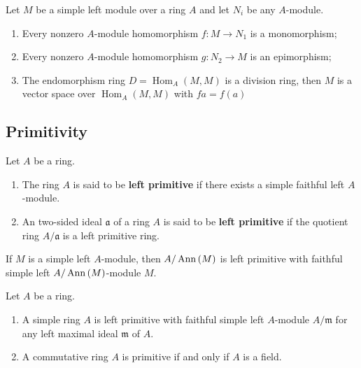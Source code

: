 \begin{lemma}[Schur]
    \label{lem: Schur's lemma}
    Let $M$ be a simple left module over a ring $A$ and let $N_i$ be any $A$-module.
    \begin{enumerate}
        \item
              Every nonzero $A$-module homomorphism $f: M \rightarrow N_1$ is a monomorphism;
        \item
              Every nonzero $A$-module homomorphism $g: N_2 \rightarrow M$ is an epimorphism;

        \item
              The endomorphism ring $D=\operatorname{Hom}_{A}(M,M)$ is a division ring,
              then $M$ is a vector space over $\operatorname{Hom}_A(M,M)$ with $f a=f(a)$
    \end{enumerate}
\end{lemma}





\subsection{Primitivity} %
\begin{definition}
    Let $A$ be a ring.
    \begin{enumerate}
        \item
              The ring $A$ is said to be \textbf{left primitive} if there exists a simple faithful left $A$-module.
        \item
              An two-sided ideal $\mathfrak{a}$ of a ring $A$ is said to be \textbf{left primitive} if the quotient ring $A / \mathfrak{a}$ is a left primitive ring.
    \end{enumerate}
    \begin{remark}
        If $M$ is a simple left $A$-module, then $A/\operatorname{\operatorname{Ann}}\left( M \right)$ is left primitive with faithful simple left $A/\operatorname{\operatorname{Ann}}\left( M \right)$-module $M$.
    \end{remark}
\end{definition}


\begin{proposition}
    Let $A$ be a ring.
    \begin{enumerate}
        \item
              A simple ring $A$ is left primitive with faithful simple left $A$-module $A/\mathfrak{m}$ for any left maximal ideal $\mathfrak{m}$ of $A$.

        \item
              A commutative ring $A$ is primitive if and only if $A$ is a field.
    \end{enumerate}
\end{proposition}

